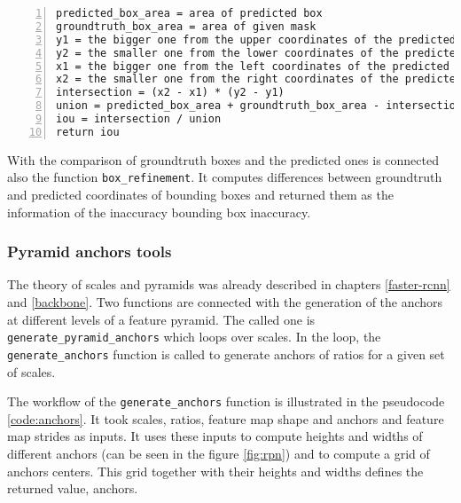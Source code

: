 {\scriptsize
\begin{lstlisting}[style=python, caption={compute\_iou}, captionpos=b, label=code:iou, deletekeywords={from, and},
backgroundcolor = \color{light-gray}, numbers=left, breaklines=true]
predicted_box_area = area of predicted box
groundtruth_box_area = area of given mask
y1 = the bigger one from the upper coordinates of the predicted and groundtruth bboxes
y2 = the smaller one from the lower coordinates of the predicted and groundtruth bboxes
x1 = the bigger one from the left coordinates of the predicted and groundtruth bboxes
x2 = the smaller one from the right coordinates of the predicted and groundtruth bboxes
intersection = (x2 - x1) * (y2 - y1)
union = predicted_box_area + groundtruth_box_area - intersection
iou = intersection / union
return iou
\end{lstlisting}}

With the comparison of groundtruth boxes and the predicted ones is connected also the function \verb|box_refinement|. It computes differences between groundtruth and predicted coordinates of bounding boxes and returned them as the information of the inaccuracy bounding box inaccuracy.


\subsubsection{Pyramid anchors tools}
\label{anchors-func}

The theory of scales and pyramids was already described in chapters \ref{faster-rcnn} and \ref{backbone}. Two functions are connected with the generation of the anchors at different levels of a feature pyramid. The called one is \verb|generate_pyramid_anchors| which loops over scales. In the loop, the \verb|generate_anchors| function is called to generate anchors of ratios for a given set of scales. 

The workflow of the \verb|generate_anchors| function is illustrated in the pseudocode \ref{code:anchors}. It took scales, ratios, feature map shape and anchors and feature map strides as inputs. It uses these inputs to compute heights and widths of different anchors (can be seen in the figure \ref{fig:rpn}) and to compute a grid of anchors centers. This grid together with their heights and widths defines the returned value, anchors.

